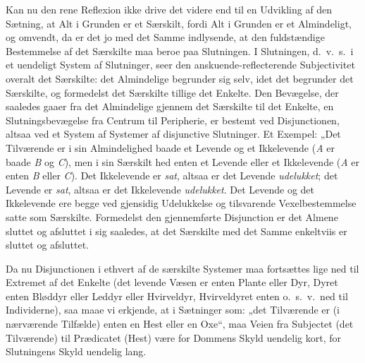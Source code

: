 \documentclass[12pt]{book}
\newcommand{\opage}[1]{\marginnote{\footnotesize\textit{[#1]}}}
\begin{document}
Kan nu den rene Reflexion ikke drive det videre end til en Udvikling af den Sætning, at Alt i Grunden er et Særskilt, fordi Alt i Grunden er et Almindeligt, og omvendt, da er det jo med det Samme indlysende, at den fuldstændige Bestemmelse af det Særskilte maa beroe paa Slutningen. I Slutningen, d.\ v.\ s.\ i et uendeligt System af Slutninger, seer den anskuende-reflecterende Subjectivitet overalt det Særskilte: det Almindelige begrunder sig selv, idet det begrunder det Særskilte, og formedelst det Særskilte tillige det Enkelte. Den Bevægelse, der saaledes gaaer fra det Almindelige gjennem det Særskilte til det Enkelte, en Slutningsbevægelse fra Centrum til Peripherie, er bestemt ved Disjunctionen, altsaa ved et System af Systemer af disjunctive Slutninger. Et Exempel: „Det Tilværende er i sin Almindelighed baade et Levende og et Ikkelevende (\textit{A} er baade \textit{B} og \textit{C}), men i sin Særskilt%
\opage{356}hed enten et Levende eller et Ikkelevende (\textit{A} er enten \textit{B} eller \textit{C}). Det Ikkelevende er \emph{sat}, altsaa er det Levende \emph{udelukket}; det Levende er \emph{sat}, altsaa er det Ikkelevende \emph{udelukket}. Det Levende og det Ikkelevende ere begge ved gjensidig Udelukkelse og tilsvarende Vexelbestemmelse satte som Særskilte. Formedelst den gjennemførte Disjunction er det Almene sluttet og afsluttet i sig saaledes, at det Særskilte med det Samme enkeltviis er sluttet og afsluttet. %

Da nu Disjunctionen i ethvert af de særskilte Systemer maa fortsættes lige ned til Extremet af det Enkelte (det levende Væsen er enten Plante eller Dyr, Dyret enten Bløddyr eller Leddyr eller Hvirveldyr, Hvirveldyret enten o.\ s.\ v.\ ned til Individerne), saa maae vi erkjende, at i Sætninger som: „det Tilværende er (i nærværende Tilfælde) enten en Hest eller en Oxe“, maa Veien fra Subjectet (det Tilværende) til Prædicatet (Hest) være for Dommens Skyld uendelig kort, for Slutningens Skyld uendelig lang.
\end{document}
